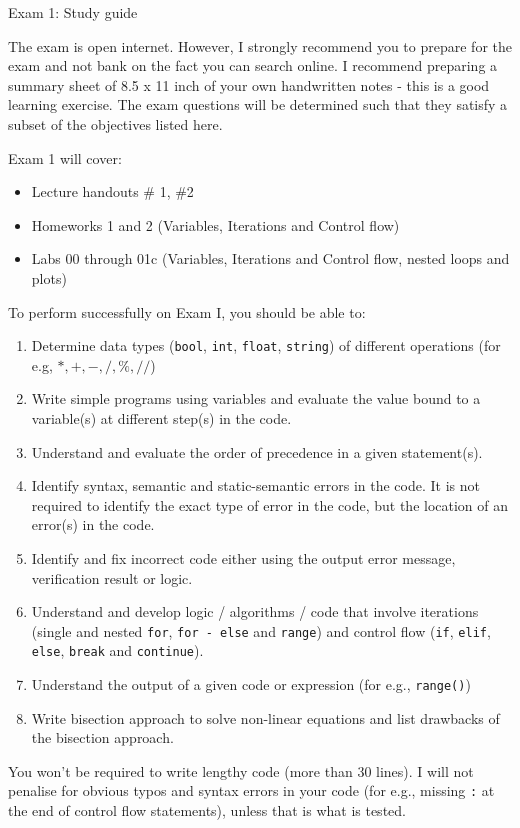 \documentclass[]{article}
\begin{document}
\begin{center}
\Large Exam 1: Study guide
\end{center}

The exam is open internet. However, I strongly recommend you to prepare for the exam and not bank on the fact you can search online. I recommend preparing a summary sheet of 8.5 x 11 inch of your own handwritten notes - this is a good learning exercise. The exam questions will be determined such that they satisfy a subset of the objectives listed here.

Exam 1 will cover:
\begin{itemize}
	\item Lecture handouts \# 1, \#2
	\item Homeworks 1 and 2 (Variables, Iterations and Control flow)
	\item Labs 00 through 01c (Variables, Iterations and Control flow, nested loops and plots)
\end{itemize}

To perform successfully on Exam I, you should be able to:

\begin{enumerate}
	\item Determine data types (\verb|bool|, \verb|int|, \verb|float|, \verb|string|) of different operations (for e.g, $*, +, -, /, \%, //$)
	\item Write simple programs using variables and evaluate the value bound to a variable(s) at different step(s) in the code.
	\item Understand and evaluate the order of precedence in a given statement(s).
	\item Identify syntax, semantic and static-semantic errors in the code. It is not required to identify the exact type of error in the code, but the location of an error(s) in the code.
	\item Identify and fix incorrect code either using the output error message, verification result or logic.
	\item Understand and develop logic / algorithms / code that involve iterations (single and nested \verb|for|, \verb|for - else| and \verb|range|) and control flow (\verb|if|, \verb|elif|, \verb|else|, \verb|break| and \verb|continue|).
	\item Understand the output of a given code or expression (for e.g., \verb|range()|)
	\item Write bisection approach to solve non-linear equations and list drawbacks of the bisection approach.

\end{enumerate}

You won't be required to write lengthy code (more than 30 lines). I will not penalise for obvious typos and syntax errors in your code (for e.g., missing \verb|:| at the end of control flow statements), unless that is what is tested.
\end{document}
